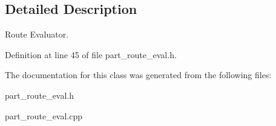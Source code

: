 \subsection{Detailed Description}
Route Evaluator. 



Definition at line 45 of file part\_\-route\_\-eval.h.

The documentation for this class was generated from the following files:\begin{CompactItemize}
\item 
part\_\-route\_\-eval.h\item 
part\_\-route\_\-eval.cpp\end{CompactItemize}
